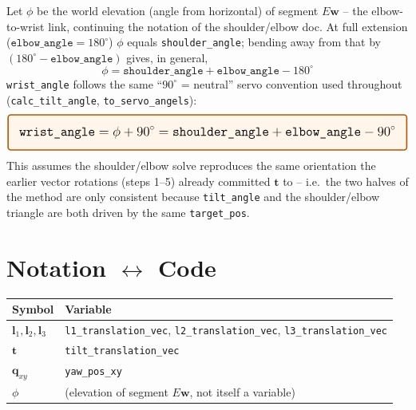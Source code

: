 \documentclass[11pt,a4paper]{article}
\begin{document}
Let $\phi$ be the world elevation (angle from horizontal) of segment $E\mathbf w$ -- the
elbow-to-wrist link, continuing the notation of the shoulder/elbow doc. At full extension
($\texttt{elbow\_angle}=180^\circ$) $\phi$ equals \texttt{shoulder\_angle}; bending away from
that by $(180^\circ - \texttt{elbow\_angle})$ gives, in general,
\begin{equation}
\phi = \texttt{shoulder\_angle} + \texttt{elbow\_angle} - 180^\circ
\end{equation}
\texttt{wrist\_angle} follows the same ``$90^\circ$ = neutral'' servo convention used
throughout (\texttt{calc\_tilt\_angle}, \texttt{to\_servo\_angels}):
\begin{equation}
\raisebox{-0.5\height}{\tikz \node[draw=orange!70!black, line width=1.4pt, rounded corners=3pt,
fill=orange!8, inner sep=12pt]
{\Large $\displaystyle \texttt{wrist\_angle} = \phi + 90^\circ =
\texttt{shoulder\_angle} + \texttt{elbow\_angle} - 90^\circ$};}
\end{equation}
This assumes the shoulder/elbow solve reproduces the same orientation the earlier vector
rotations (steps 1--5) already committed $\mathbf t$ to -- i.e.\ the two halves of the method
are only consistent because \texttt{tilt\_angle} and the shoulder/elbow triangle are both
driven by the same \texttt{target\_pos}.

\section{Notation $\leftrightarrow$ Code}

\begin{center}
\begin{tabular}{@{}ll@{}}
\toprule
Symbol & Variable \\
\midrule
$\mathbf l_1,\mathbf l_2,\mathbf l_3$ & \texttt{l1\_translation\_vec}, \texttt{l2\_translation\_vec}, \texttt{l3\_translation\_vec} \\
$\mathbf t$ & \texttt{tilt\_translation\_vec} \\
$\mathbf q_{xy}$ & \texttt{yaw\_pos\_xy} \\
$\phi$ & (elevation of segment $E\mathbf w$, not itself a variable) \\
\bottomrule
\end{tabular}
\end{center}
\end{document}
